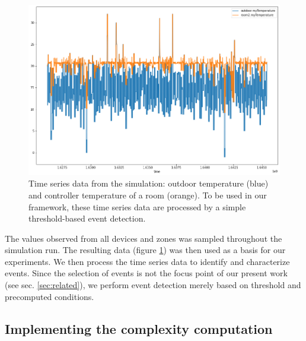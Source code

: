 \documentclass[entropy,article,submit,moreauthors,pdftex]{Definitions/mdpi}
\begin{document}
\begin{figure}[ht]
    \includegraphics[width=\linewidth]{figures/ts_example}
    \caption{Time series data from the simulation: outdoor temperature (blue) and
        controller temperature of a room (orange). To be used in our framework, these time series data are
        processed by a simple threshold-based event detection.}
    \label{fig:ts_example}
\end{figure}

The values observed from all devices and zones was sampled throughout
the simulation run. The resulting data (figure
\ref{fig:ts_example}) was then used as a basis for our experiments.
We then process the time series data to identify and characterize events.
Since the selection of events is not the focus point of our present work (see sec.
\ref{sec:related}), we perform event detection merely based on threshold and precomputed conditions.


\subsection{Implementing the complexity computation}
\end{document}
